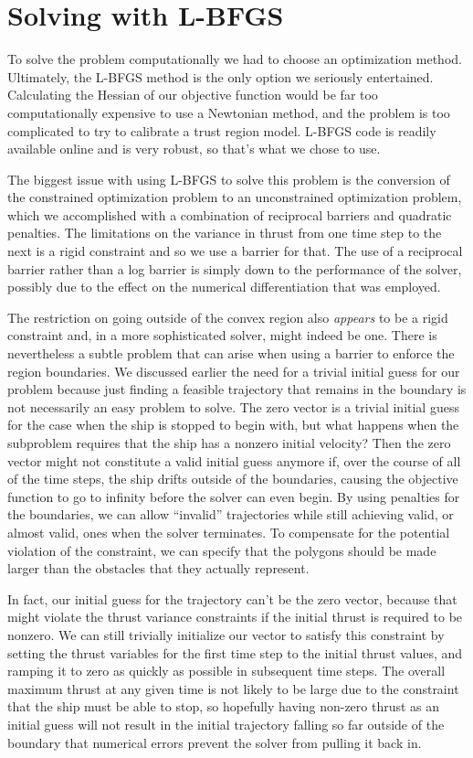 \documentclass{report}
\begin{document}
\section{Solving with L-BFGS}
To solve the problem computationally we had to choose an optimization method. Ultimately, the L-BFGS method is
the only option we seriously entertained. Calculating the Hessian of our objective function would be far too 
computationally expensive to use a Newtonian method, and the problem is too complicated to try to calibrate a
trust region model. L-BFGS code is readily available online and is very robust, so that's what we chose to use.

The biggest issue with using L-BFGS to solve this problem is the conversion of the constrained optimization problem
to an unconstrained optimization problem, which we accomplished with a combination of reciprocal barriers
and quadratic penalties. The limitations on the variance in thrust from one time step to the next is a rigid constraint
and so we use a barrier for that. The use of a reciprocal barrier rather than a log barrier is simply down to the
performance of the solver, possibly due to the effect on the numerical differentiation that was employed.

The restriction on going outside of the convex region also \emph{appears} to be a rigid constraint and, in a more
sophisticated solver, might indeed be one. There is nevertheless a subtle problem that can arise when using a barrier
to enforce the region boundaries. We discussed earlier the need for a trivial initial guess for our problem because
just finding a feasible trajectory that remains in the boundary is not necessarily an easy problem to solve. The
zero vector is a trivial initial guess for the case when the ship is stopped to begin with, but what happens when
the subproblem requires that the ship has a nonzero initial velocity? Then the zero vector might not constitute a 
valid initial guess anymore if, over the course of all of the time steps, the ship drifts outside of the boundaries,
causing the objective function to go to infinity before the solver can even begin. By using penalties for the boundaries,
we can allow ``invalid'' trajectories while still achieving valid, or almost valid, ones when the solver terminates.
To compensate for the potential violation of the constraint, we can specify that the polygons should be made larger
than the obstacles that they actually represent.

In fact, our initial guess for the trajectory can't be the zero vector, because that might violate the thrust variance
constraints if the initial thrust is required to be nonzero. We can still trivially initialize our vector to 
satisfy this constraint by setting the thrust variables for the first time step to the initial thrust values, and ramping it
to zero as quickly as possible in subsequent time steps.
The overall maximum thrust at any given time is not likely to be large due
to the constraint that the ship must be able to stop,
so hopefully having non-zero thrust as an initial guess will not result in the initial trajectory falling so far
outside of the boundary that numerical errors prevent the solver from pulling it back in.
\end{document}
